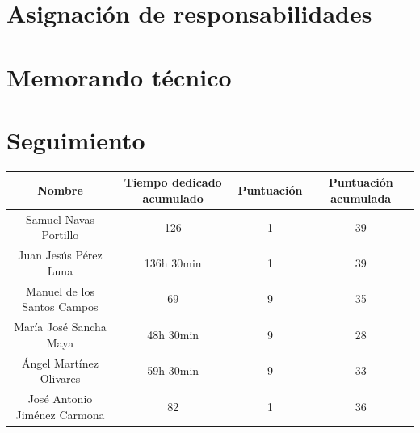 \documentclass[11 pt]{book}
\begin{document}
	\section{Asignación de responsabilidades}
		
		
		
		
		
		
		
		
		
		
		
		
		
		
		
		
		
		
		
		
		
		
		
		
	\section{Memorando técnico}
		
		
	\section{Seguimiento}
		\begin{tabular}{|c|c|c|c|}
			\hline
			Nombre & Tiempo dedicado acumulado & Puntuación & Puntuación acumulada\\
			\hline
			Samuel Navas Portillo & 126 & 1 & 39\\
			Juan Jesús Pérez Luna & 136h 30min & 1 & 39\\
			Manuel de los Santos Campos & 69 & 9 & 35\\
			María José Sancha Maya & 48h 30min & 9 & 28\\
			Ángel Martínez Olivares & 59h 30min & 9 & 33\\
			José Antonio Jiménez Carmona & 82 & 1 & 36\\
			\hline
		\end{tabular}
\end{document}
